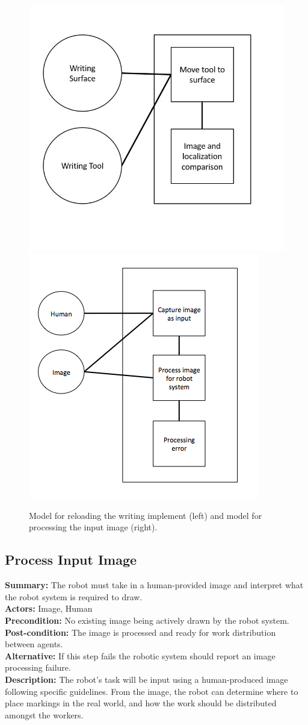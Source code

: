 \begin{figure}
 \centering
  \includegraphics[width=0.48\columnwidth]{figs/use_case-use_writing_implement.jpg}
  \includegraphics[width=0.48\columnwidth]{figs/use_case-process_input_image.jpg}
 \label{fig:reload_implement_and_image}
 \caption{Model for reloading the writing implement (left) and model for processing the input image (right).}
\end{figure}

\subsection{Process Input Image}
\textbf{Summary:} The robot must take in a human-provided image and interpret what the robot system is required to draw. \\
\textbf{Actors:} Image, Human \\
\textbf{Precondition:}  No existing image being actively drawn by the robot system. \\
\textbf{Post-condition:} The image is processed and ready for work distribution between agents. \\
\textbf{Alternative:} If this step fails the robotic system should report an image processing failure. \\
\textbf{Description:} The robot's task will be input using a human-produced image following specific guidelines. From the image, the robot can determine where to place markings in the real world, and how the work should be distributed amongst the workers. \\


